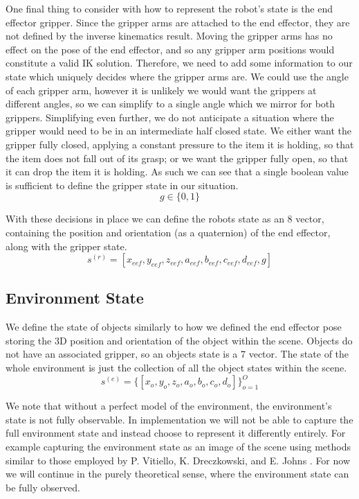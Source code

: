 One final thing to consider with how to represent the robot's state is the end effector gripper. Since the gripper arms are attached to the end effector, they are not defined by the inverse kinematics result. Moving the gripper arms has no effect on the pose of the end effector, and so any gripper arm positions would constitute a valid IK solution. Therefore, we need to add some information to our state which uniquely decides where the gripper arms are. We could use the angle of each gripper arm, however it is unlikely we would want the grippers at different angles, so we can simplify to a single angle which we mirror for both grippers. Simplifying even further, we do not anticipate a situation where the gripper would need to be in an intermediate half closed state. We either want the gripper fully closed, applying a constant pressure to the item it is holding, so that the item does not fall out of its grasp; or we want the gripper fully open, so that it can drop the item it is holding. As such we can see that a single boolean value is sufficient to define the gripper state in our situation.
$$g \in \{0,1\}$$

With these decisions in place we can define the robots state as an 8 vector, containing the position and orientation (as a quaternion) of the end effector, along with the gripper state. 
$$s^{(r)} = [x_{eef}, y_{eef}, z_{eef}, a_{eef}, b_{eef}, c_{eef}, d_{eef}, g]$$

\subsection{Environment State}
We define the state of objects similarly to how we defined the end effector pose storing the 3D position and orientation of the object within the scene. Objects do not have an associated gripper, so an objects state is a 7 vector. The state of the whole environment is just the collection of all the object states within the scene.
$$s^{(e)} = \{[x_o, y_o, z_o, a_o, b_o, c_o, d_o]\}_{o=1}^O$$

We note that without a perfect model of the environment, the environment's state is not fully observable. In implementation we will not be able to capture the full environment state and instead choose to represent it differently entirely. For example capturing the environment state as an image of the scene using methods similar to those employed by P. Vitiello, K. Dreczkowski, and E. Johns \cite{one-shot-pose-estimate}. For now we will continue in the purely theoretical sense, where the environment state can be fully observed.\\

